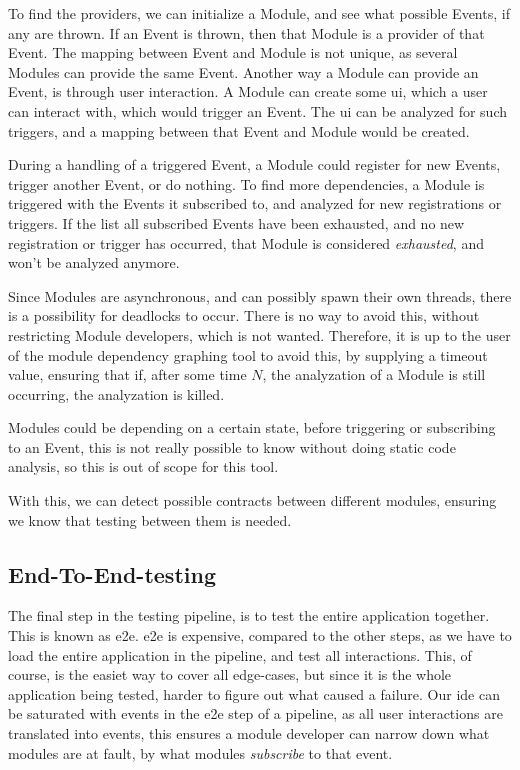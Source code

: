 To find the providers, we can initialize a Module, and see what possible
Events, if any are thrown. If an Event is thrown, then that Module is a
provider of that Event. The mapping between Event and Module is not unique,
as several Modules can provide the same Event. Another way a Module can
provide an Event, is through user interaction. A Module can create some
\gls*{ui}, which a user can interact with, which would trigger an Event. The
\gls*{ui} can be analyzed for such triggers, and a mapping between that Event and
Module would be created.

During a handling of a triggered Event, a Module could register for new
Events, trigger another Event, or do nothing. To find more dependencies, a
Module is triggered with the Events it subscribed to, and analyzed for new
registrations or triggers. If the list all subscribed Events have been
exhausted, and no new registration or trigger has occurred, that Module is
considered \textit{exhausted}, and won't be analyzed anymore.

Since Modules are asynchronous, and can possibly spawn their own threads, there
is a possibility for deadlocks to occur. There is no way to avoid this, without
restricting Module developers, which is not wanted. Therefore, it is up to
the user of the module dependency graphing tool to avoid this, by supplying a
timeout value, ensuring that if, after some time $N$, the analyzation of a
Module is still occurring, the analyzation is killed.

Modules could be depending on a certain state, before triggering or
subscribing to an Event, this is not really possible to know without doing
static code analysis, so this is out of scope for this tool.

With this, we can detect possible contracts between different modules, ensuring
we know that testing between them is needed.

\subsection{End-To-End-testing}

The final step in the testing pipeline, is to test the entire application
together. This is known as \gls*{e2e}. \gls*{e2e} is expensive, compared to the
other steps, as we have to load the entire application in the pipeline, and test
all interactions. This, of course, is the easiet way to cover all edge-cases, but
since it is the whole application being tested, harder to figure out what caused
a failure. Our \gls*{ide} can be saturated with events in the \gls*{e2e} step of a
pipeline, as all user interactions are translated into events, this ensures a
module developer can narrow down what modules are at fault, by what modules
\textit{subscribe} to that event.

